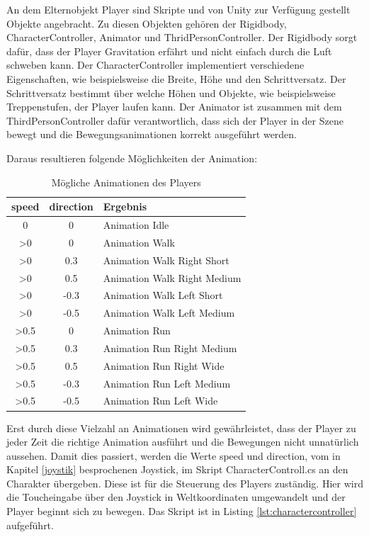 			An dem Elternobjekt Player sind Skripte und von Unity zur Verfügung gestellt Objekte angebracht. Zu diesen Objekten gehören der Rigidbody, CharacterController, Animator und ThridPersonController. Der Rigidbody sorgt dafür, dass der Player Gravitation erfährt und nicht einfach durch die Luft schweben kann. Der CharacterController implementiert verschiedene Eigenschaften, wie beispielsweise die Breite, Höhe und den Schrittversatz. Der Schrittversatz bestimmt über welche Höhen und Objekte, wie beispielsweise Treppenstufen, der Player laufen kann. Der Animator ist zusammen mit dem ThirdPersonController dafür verantwortlich, dass sich der Player in der Szene bewegt und die Bewegungsanimationen korrekt ausgeführt werden. 
	
			Daraus resultieren folgende Möglichkeiten der Animation:

 \begin{table}[htbp]
 \centering
 \begin{tabular}{|c|c|l|}
 \hline
  speed & direction & Ergebnis \\
 \hline
  0 & 0 & Animation Idle \\
  >0 & 0 & Animation Walk \\
  >0 & 0.3 & Animation Walk Right Short \\
  >0 & 0.5 & Animation Walk Right Medium \\
  >0 & -0.3 & Animation Walk Left Short \\
  >0 & -0.5 & Animation Walk Left Medium \\
  >0.5 & 0 & Animation Run \\
  >0.5 & 0.3 & Animation Run Right Medium \\
  >0.5 & 0.5 & Animation Run Right Wide \\
  >0.5 & -0.3 & Animation Run Left Medium \\
  >0.5 & -0.5 & Animation Run Left Wide \\ \hline
 \end{tabular}
  \caption{Mögliche Animationen des Players}
 \label{tab:tabspeeddirection}
 \end{table}
 
			\pagebreak
			Erst durch diese Vielzahl an Animationen wird gewährleistet, dass der Player zu jeder Zeit die richtige Animation ausführt und die Bewegungen nicht unnatürlich aussehen. Damit dies passiert, werden die Werte speed und direction, vom in Kapitel \ref{joystik} besprochenen Joystick, im Skript CharacterControll.cs an den Charakter übergeben. Diese ist für die Steuerung des Players zuständig. Hier wird die Toucheingabe über den Joystick in Weltkoordinaten umgewandelt und der Player beginnt sich zu bewegen. Das Skript ist in Listing \ref{lst:charactercontroller} aufgeführt.
	
